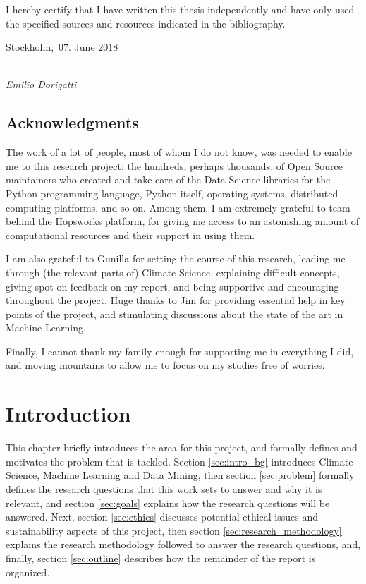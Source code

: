 \documentclass[a4paper,11pt]{kth-mag}
\begin{document}
I hereby certify that I have written this thesis independently and have only used the specified sources and resources indicated in the bibliography.

\vspace{2cm}

\noindent
Stockholm,\, 07. June 2018 %

\vspace{3cm}

\hspace*{7cm}%
\dotfill\\
\hspace*{8.5cm}%
\textit{Emilio Dorigatti}
\newpage

\section*{Acknowledgments}
The work of a lot of people, most of whom I do not know, was needed to enable me to this research project: the hundreds, perhaps thousands, of Open Source maintainers who created and take care of the Data Science libraries for the Python programming language, 
Python itself, operating systems, distributed computing platforms, and so on. Among them, I am extremely grateful to team behind the Hopsworks platform, for giving me access to an astonishing amount of computational resources and their support in using them.

I am also grateful to Gunilla for setting the course of this research, leading me through (the relevant parts of) Climate Science, explaining difficult concepts, giving spot on feedback on my report, and being supportive and encouraging throughout the project. Huge thanks to Jim for providing essential help in key points of the project, and stimulating discussions about the state of the art in Machine Learning.

Finally, I cannot thank my family enough for supporting me in everything I did, and moving mountains to allow me to focus on my studies free of worries.
\clearpage

\tableofcontents*

\mainmatter
\pagestyle{newchap}

\chapter{Introduction}
This chapter briefly introduces the area for this project, and formally defines and motivates the problem that is tackled. Section \ref{sec:intro_bg} introduces Climate Science, Machine Learning and Data Mining, then section \ref{sec:problem} formally defines the research questions that this work sets to answer and why it is relevant, and section \ref{sec:goals} explains how the research questions will be answered. Next, section \ref{sec:ethics} discusses potential ethical issues and sustainability aspects of this project, then section \ref{sec:research_methodology} explains the research methodology followed to answer the research questions, and, finally, section \ref{sec:outline} describes how the remainder of the report is organized.
\end{document}
